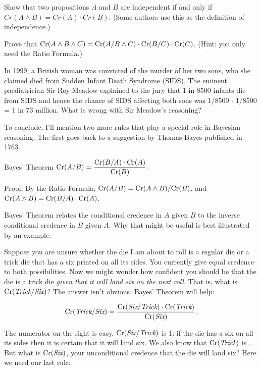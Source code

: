 \begin{exercise}
  Show that two propositions $A$ and $B$ are independent if and only
  if $Cr(A \land B) = Cr(A) \cdot Cr(B)$. (Some authors use this as
  the definition of independence.)
\end{exercise}

\begin{exercise}
  Prove that $\text{Cr}(A \land B \land C) = \text{Cr}(A/B \land C) \cdot \text{Cr}(B/C) \cdot
  \text{Cr}(C)$. (Hint: you only need the Ratio Formula.)
\end{exercise}

\begin{exercise}
  In 1999, a British woman was convicted of the murder of her two
  sons, who she claimed died from Sudden Infant Death Syndrome
  (SIDS). The eminent paediatrician Sir Roy Meadow explained to the
  jury that 1 in 8500 infants die from SIDS and hence the chance of
  SIDS affecting both sons was 1/8500 $\cdot$ 1/8500 = 1 in 73
  million. What is wrong with Sir Meadow's reasoning?
\end{exercise}

To conclude, I'll mention two more rules that play a special role in
Bayesian reasoning. The first goes back to a suggestion by Thomas
Bayes published in 1763.
%
\begin{genericthm}{Bayes' Theorem}
  $\text{Cr}(A/B) = \dfrac{\text{Cr}(B/A) \cdot \text{Cr}(A)}{\text{Cr}(B)}.$
\end{genericthm}
%
Proof: By the Ratio Formula, $\text{Cr}(A/B) = \text{Cr}(A \land B) / \text{Cr}(B)$, and
$\text{Cr}(A \land B) = \text{Cr}(B/A) \cdot \text{Cr}(A)$.

Bayes' Theorem relates the conditional credence in $A$ given $B$ to the
inverse conditional credence in $B$ given $A$. Why that might be
useful is best illustrated by an example.

Suppose you are unsure whether the die I am about to roll is a regular
die or a trick die that has a six printed on all its sides. You
currently give equal credence to both possibilities. Now we might
wonder how confident you should be that the die is a trick die
\emph{given that it will land six on the next roll}. That is, what is
$\text{Cr}(\emph{Trick}/ \emph{Six})$? The answer isn't obvious. Bayes'
Theorem will help:

\[
  \text{Cr}(\emph{Trick}/\emph{Six}) = \frac{\text{Cr}(\emph{Six}/\emph{Trick}) \cdot \text{Cr}(\emph{Trick})}{\text{Cr}(\emph{Six})}.
\]

The numerator on the right is easy. $\text{Cr}(\emph{Six}/ \emph{Trick})$ is
1: if the die has a six on all its sides then it is certain that it
will land six. We also know that $\text{Cr}(\emph{Trick})$ is
. But what is $\text{Cr}(\emph{Six})$, your unconditional
credence that the die will land six? Here we need our last rule:

